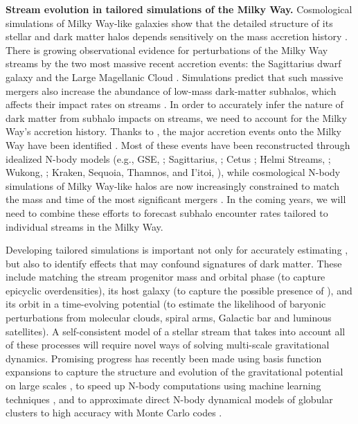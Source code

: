\documentclass[final,5p,times,twocolumn,authoryear]{elsarticle}
\begin{document}
\textbf{Stream evolution in tailored simulations of the Milky Way.}
Cosmological simulations of Milky Way-like galaxies show that the detailed structure of its stellar and dark matter halos depends sensitively on the mass accretion history \citep[e.g.,][]{bullock:2005,springel:2008,cooper:2010,hopkins:2018,bose:2020,pillepich:2023}.
There is growing observational evidence for perturbations of the Milky Way streams by the two most massive recent accretion events: the Sagittarius dwarf galaxy \citep[e.g.,][]{bonaca:2020,li:2021,woudenberg:2023} and the Large Magellanic Cloud \citep[e.g.,][]{erkal:2019, shipp:2019, lilleengen:2023, koposov:2023, brooks:2024}.
Simulations predict that such massive mergers also increase the abundance of low-mass dark-matter subhalos, which affects their impact rates on streams \citep[e.g.,][]{barry:2023, arora:2023}.
In order to accurately infer the nature of dark matter from subhalo impacts on streams, we need to account for the Milky Way's accretion history.
Thanks to \gaia, the major accretion events onto the Milky Way have been identified \citep[e.g.,][and references therein]{kruijssen:2020}.
Most of these events have been reconstructed through idealized N-body models (e.g., GSE, \citealt{naidu:2021}; Sagittarius, \citealt{vasiliev:2021}; Cetus \citealt{chang:2020}; Helmi Streams, \citealt{koppelman:2019}; Wukong, \citealt{malhan:2021b}; Kraken, Sequoia, Thamnos, and I'itoi, \citealt{sharpe:2024}), while cosmological N-body simulations of Milky Way-like halos are now increasingly constrained to match the mass and time of the most significant mergers \citep[e.g.,][]{nadler:2020,buch:2024}.
In the coming years, we will need to combine these efforts to forecast subhalo encounter rates tailored to individual streams in the Milky Way.

Developing tailored simulations is important not only for accurately estimating , but also to identify effects that may confound signatures of dark matter.
These include matching the stream progenitor mass and orbital phase (to capture epicyclic overdensities), its host galaxy (to capture the possible presence of ), and its orbit in a time-evolving potential (to estimate the likelihood of baryonic perturbations from molecular clouds, spiral arms, Galactic bar and luminous satellites).
A self-consistent model of a stellar stream that takes into account all of these processes will require novel ways of solving multi-scale gravitational dynamics.
Promising progress has recently been made using basis function expansions  to capture the structure and evolution of the gravitational potential on large scales \citep{garavito-camargo:2021,petersen:2022, green:2023, kalda:2024, hogg:2024}, to speed up N-body computations  using machine learning techniques \citep{breen:2020,villaescusa-navarro:2021}, and to approximate direct N-body dynamical models of globular clusters to high accuracy with Monte Carlo codes \citep{rodriguez:2015,kremer:2020}.
\end{document}
